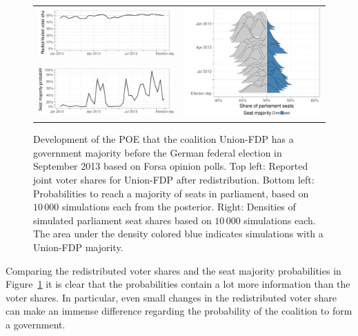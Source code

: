\documentclass[smallcondensed]{svjour3}     %
\begin{document}
\begin{figure}[H]\centering
\begin{tabular}{ll}
\includegraphics[height=.15\textwidth]{figures/2013_forsa_cdufdp_rawSharesRedist.pdf}
&
\multirow{2}{*}[13ex]{\includegraphics[height=30ex]{figures/2013_forsa_cdufdp_ridgeline.pdf}}
\\
\includegraphics[height=.15\textwidth]{figures/2013_forsa_cdufdp_prob.pdf}
\end{tabular}
\caption{Development of the POE that the coalition Union-FDP has a government majority before the German federal election in September 2013 based on Forsa opinion polls.
Top left: Reported joint voter shares for Union-FDP after redistribution.
Bottom left: Probabilities to reach a majority of seats in parliament, based on
$10\,000$ simulations each from the posterior.
Right: Densities of simulated parliament seat shares based on $10\,000$ simulations each.
The area under the density colored blue indicates simulations with a
Union-FDP majority.
\label{fig:seatDist_time}
}
\end{figure}

Comparing the redistributed voter shares and the seat majority probabilities
in Figure~\ref{fig:seatDist_time} it is clear that the probabilities contain
a lot more information than the voter shares. In particular, even small changes
in the redistributed voter share can make an immense difference regarding the
probability of the coalition to form a government.\\
\end{document}
